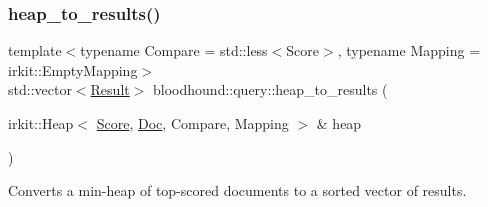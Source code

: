 \subsubsection{\texorpdfstring{heap\+\_\+to\+\_\+results()}{heap\_to\_results()}}
{\footnotesize\ttfamily template$<$typename Compare  = std\+::less$<$\+Score$>$, typename Mapping  = irkit\+::\+Empty\+Mapping$>$ \\
std\+::vector$<$\hyperlink{structbloodhound_1_1query_1_1Result}{Result}$>$ bloodhound\+::query\+::heap\+\_\+to\+\_\+results (\begin{DoxyParamCaption}\item[{irkit\+::\+Heap$<$ \hyperlink{structbloodhound_1_1Score}{Score}, \hyperlink{structbloodhound_1_1Doc}{Doc}, Compare, Mapping $>$ \&}]{heap }\end{DoxyParamCaption})}



Converts a min-\/heap of top-\/scored documents to a sorted vector of results. 

